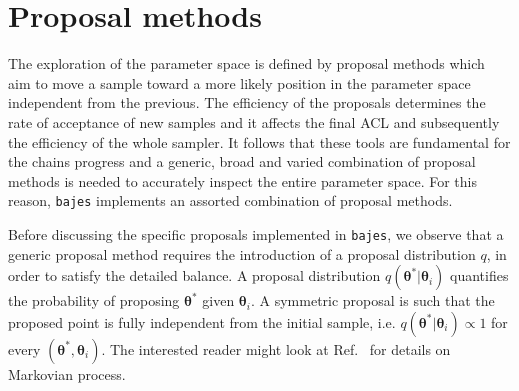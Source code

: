 \documentclass[prd,aps,twocolumn,a4paper,showkeys,nofootinbib,floatfix]{revtex4-1}
\def\params{\boldsymbol{\theta}}
\newcommand{\bajes}{{\tt bajes}}
\begin{document}
 \section{Proposal methods} 
\label{app:proposal}

The exploration of the parameter space is defined 
by proposal methods which aim to move a sample 
toward a more likely position in the parameter space independent from the previous.
The efficiency of the proposals determines the rate of acceptance 
of new samples and it affects the final ACL and subsequently the efficiency of the whole sampler.
It follows that these tools are fundamental for the chains progress 
and a generic, broad and varied combination of proposal methods is needed to
accurately inspect the entire parameter space.
For this reason, {\bajes} implements an assorted combination of proposal methods.

Before discussing the specific proposals implemented in {\bajes},
we observe that a generic proposal method requires the introduction of a proposal distribution $q$, 
in order to satisfy the detailed balance.
A proposal distribution $q(\params^*|\params_i)$
 quantifies the probability of proposing $\params^*$ given $\params_i$.
A symmetric proposal is such that the proposed point is fully independent from the initial sample,
i.e. $q(\params^*|\params_i) \propto 1$ for every $(\params^*,\params_i)$.
The interested reader might 
look at Ref.~\cite{Hastings1970,roberts_rosenthal_2007}
for details on Markovian process.
\end{document}
